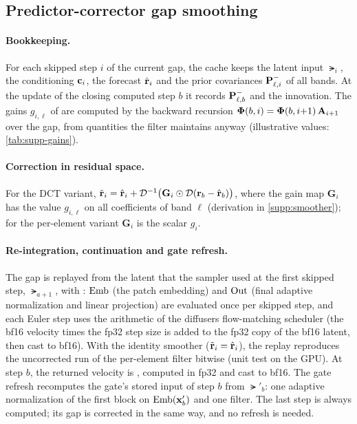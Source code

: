 \subsection{Predictor-corrector gap smoothing}
\label{supp:pcgs-impl}

\paragraph{Bookkeeping.}
For each skipped step $i$ of the current gap, the cache keeps the latent input $\lat_i$, the conditioning $\mathbf{c}_i$,
the forecast $\hat{\mathbf{r}}_i$ and the prior covariances $\mathbf{P}^{-}_{\ell,i}$ of all bands. At the update of the closing
computed step $b$ it records $\mathbf{P}^{-}_{\ell,b}$ and the innovation. The gains $g_{i,\ell}$ of
 are computed by the backward recursion $\bm{\Phi}(b,i)=\bm{\Phi}(b,i{+}1)\,\mathbf{A}_{i+1}$ over the gap,
from quantities the filter maintains anyway (illustrative values: \cref{tab:supp-gains}).

\paragraph{Correction in residual space.}
For the DCT variant, $\tilde{\mathbf{r}}_i=\hat{\mathbf{r}}_i+\mathcal D^{-1}\big(\mathbf G_i\odot\mathcal D(\mathbf{r}_b-\hat{\mathbf{r}}_b)\big)$, where the
gain map $\mathbf G_i$ has the value $g_{i,\ell}$ on all coefficients of band $\ell$ (derivation in
\cref{supp:smoother}); for the per-element variant $\mathbf G_i$ is the scalar $g_i$.

\paragraph{Re-integration, continuation and gate refresh.}
The gap is replayed from the latent that the sampler used at the first skipped step, $\lat_{a+1}$, with
: $\operatorname{Emb}$ (the patch embedding) and $\operatorname{Out}$ (final adaptive normalization and linear projection) are
evaluated once per skipped step, and each Euler step uses the arithmetic of the diffusers flow-matching scheduler (the
bf16 velocity times the fp32 step size is added to the fp32 copy of the bf16 latent, then cast to bf16). With the
identity smoother ($\tilde{\mathbf{r}}_i=\hat{\mathbf{r}}_i$), the replay reproduces the uncorrected run of the per-element filter bitwise
(unit test on the GPU). At step $b$, the returned velocity is , computed in fp32 and cast to bf16.
The gate refresh recomputes the \sea gate's stored input of step $b$ from $\lat'_b$: one adaptive normalization of the
first block on $\operatorname{Emb}(\mathbf{x}'_b)$ and one \sea filter. The last step is always computed; its gap is corrected in the same
way, and no refresh is needed.

